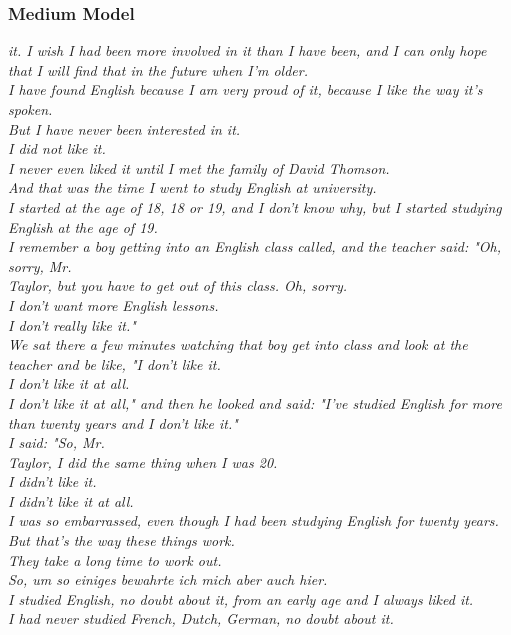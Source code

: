 \documentclass{scrartcl}
\begin{document}
\subsubsection{Medium Model}
{\itshape
 it.
I wish I had been more involved in it than I have been, and I can only hope that I will find that in the future when I'm older.
\\
I have found English because I am very proud of it, because I like the way it's spoken.
\\
But I have never been interested in it.
 \\
I did not like it.
 \\
I never even liked it until I met the family of David Thomson.
\\
And that was the time I went to study English at university.
\\
I started at the age of 18, 18 or 19, and I don't know why, but I started studying English at the age of 19.
\\
I remember a boy getting into an English class called, and the teacher said: "Oh, sorry, Mr.
\\
Taylor, but you have to get out of this class.
Oh, sorry.
\\
I don't want more English lessons.
\\
I don't really like it."
\\
We sat there a few minutes watching that boy get into class and look at the teacher and be like, "I don't like it.
\\
I don't like it at all.
\\
I don't like it at all," and then he looked and said: "I've studied English for more than twenty years and I don't like it."
\\
I said: "So, Mr.
\\
Taylor, I did the same thing when I was 20.
\\
I didn't like it.
\\
I didn't like it at all.
\\
I was so embarrassed, even though I had been studying English for twenty years.
\\
But that's the way these things work.
\\
They take a long time to work out.
\\
So, um so einiges bewahrte ich mich aber auch hier.
\\
I studied English, no doubt about it, from an early age and I always liked it.
\\
I had never studied French, Dutch, German, no doubt about it.
}
\end{document}
